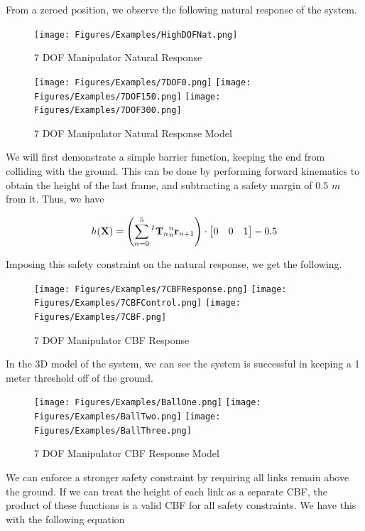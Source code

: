 \noindent From a zeroed position, we observe the following natural response of the system.

\begin{figure}[H]
    \centering
    \texttt{[image: Figures/Examples/HighDOFNat.png]}
    \caption{7 DOF Manipulator Natural Response}
    \label{fig:HighDOFNat}
    \texttt{[image: Figures/Examples/7DOF0.png]}
    \texttt{[image: Figures/Examples/7DOF150.png]}
    \texttt{[image: Figures/Examples/7DOF300.png]}
    \caption{7 DOF Manipulator Natural Response Model}
\end{figure}

\noindent We will first demonstrate a simple barrier function, keeping the end from colliding with the ground. This can be done by performing forward kinematics to obtain the height of the last frame, and subtracting a safety margin of 0.5 $m$ from it. Thus, we have

\begin{align}
    h(\mathbf{X}) = \left (\sum_{n=0}^5 {^I\mathbf{T}_n}{^n_n\mathbf{r}_{n+1}} \right) \cdot \begin{bmatrix} 0 & 0 & 1\end{bmatrix} - 0.5
\end{align}

\noindent Imposing this safety constraint on the natural response, we get the following.

\begin{figure}[H]
    \centering
    \texttt{[image: Figures/Examples/7CBFResponse.png]}
    \texttt{[image: Figures/Examples/7CBFControl.png]}
    \texttt{[image: Figures/Examples/7CBF.png]}
    \caption{7 DOF Manipulator CBF Response}
    \label{fig:7DOFCBFResponse1}
\end{figure}

\noindent In the 3D model of the system, we can see the system is successful in keeping a 1 meter threshold off of the ground.

\begin{figure}[H]
    \centering
    \texttt{[image: Figures/Examples/BallOne.png]}
          \texttt{[image: Figures/Examples/BallTwo.png]}
          \texttt{[image: Figures/Examples/BallThree.png]}
          
    \caption{7 DOF Manipulator CBF Response Model}
    \label{fig:7DOFBall1}
    
\end{figure}

\noindent We can enforce a stronger safety constraint by requiring all links remain above the ground. If we can treat the height of each link as a separate CBF, the product of these functions is a valid CBF for all safety constraints. We have this with the following equation

